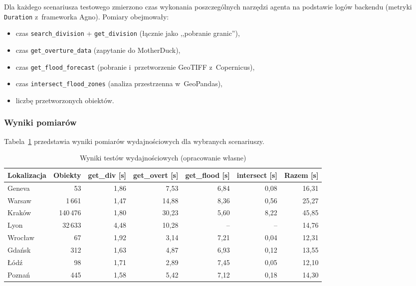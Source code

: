 Dla każdego scenariusza testowego zmierzono czas wykonania poszczególnych narzędzi agenta na podstawie logów backendu (metryki \texttt{Duration} z~frameworka Agno). Pomiary obejmowały:
\begin{itemize}
    \item czas \texttt{search\_division} + \texttt{get\_division} (łącznie jako ,,pobranie granic''),
    \item czas \texttt{get\_overture\_data} (zapytanie do MotherDuck),
    \item czas \texttt{get\_flood\_forecast} (pobranie i~przetworzenie GeoTIFF z~Copernicus),
    \item czas \texttt{intersect\_flood\_zones} (analiza przestrzenna w~GeoPandas),
    \item liczbę przetworzonych obiektów.
\end{itemize}

\subsubsection{Wyniki pomiarów}

Tabela~\ref{tab:performance} przedstawia wyniki pomiarów wydajnościowych dla wybranych scenariuszy.

\begin{table}[H]
    \centering
    \caption{Wyniki testów wydajnościowych (opracowanie własne)}
    \footnotesize
    \begin{tabular}{|l|r|r|r|r|r|r|}
        \hline
        \textbf{Lokalizacja} & \textbf{Obiekty} & \textbf{get\_div [s]} & \textbf{get\_overt [s]} & \textbf{get\_flood [s]} & \textbf{intersect [s]} & \textbf{Razem [s]} \\
        \hline
        Geneva & 53 & 1,86 & 7,53 & 6,84 & 0,08 & 16,31 \\
        \hline
        Warsaw & 1\,661 & 1,47 & 14,88 & 8,36 & 0,56 & 25,27 \\
        \hline
        Kraków & 140\,476 & 1,80 & 30,23 & 5,60 & 8,22 & 45,85 \\
        \hline
        Lyon & 32\,633 & 4,48 & 10,28 & -- & -- & 14,76 \\
        \hline
        Wrocław & 67 & 1,92 & 3,14 & 7,21 & 0,04 & 12,31 \\
        \hline
        Gdańsk & 312 & 1,63 & 4,87 & 6,93 & 0,12 & 13,55 \\
        \hline
        Łódź & 98 & 1,71 & 2,89 & 7,45 & 0,05 & 12,10 \\
        \hline
        Poznań & 445 & 1,58 & 5,42 & 7,12 & 0,18 & 14,30 \\
        \hline
    \end{tabular}
    \label{tab:performance}
\end{table}

